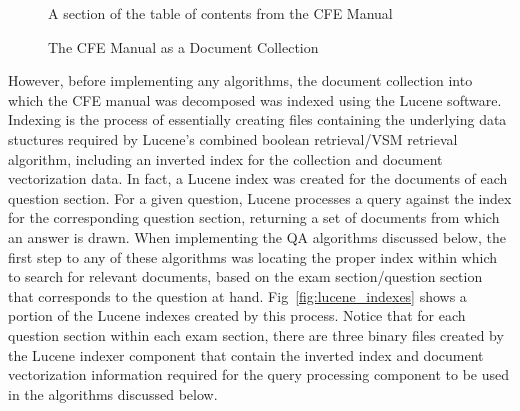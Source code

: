 \begin{figure}
\centering
\vspace{1.0in}
\caption{A section of the table of contents from the CFE Manual}
\label{fig:cfe_manual_toc}
\end{figure}

\begin{figure}
\centering
\vspace{1.0in}
\caption{The CFE Manual as a Document Collection}
\label{fig:document_collection}
\end{figure}

However, before implementing any algorithms, the document collection into which the CFE manual was decomposed was indexed using the Lucene software.  Indexing is the process of essentially creating files containing the underlying data stuctures required by Lucene's combined boolean retrieval/VSM retrieval algorithm, including an inverted index for the collection and document vectorization data.  In fact, a Lucene index was created for the documents of each question section.   For a given question, Lucene processes a query against the index for the corresponding question section, returning a set of documents from which an answer is drawn.  When implementing the QA algorithms discussed below, the first step to any of these algorithms was locating the proper index within which to search for relevant documents, based on the exam section/question section that corresponds to the question at hand.  Fig~\ref{fig:lucene_indexes} shows a portion of the Lucene indexes created by this process.  Notice that for each question section within each exam section, there are three binary files created by the Lucene indexer component that contain the inverted index and document vectorization information required for the query processing component to be used in the algorithms discussed below.

